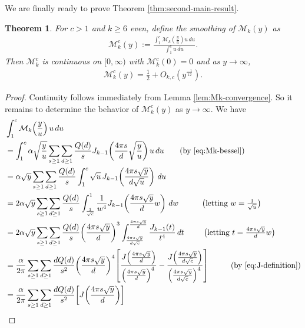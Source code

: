 \documentclass[12pt,letterpaper,reqno]{amsart}
\theoremstyle{plain}
\newtheorem{theorem}{Theorem}[section]
\theoremstyle{definition}
\numberwithin{equation}{section}
\numberwithin{figure}{section}
\numberwithin{table}{section}
\newcommand{\lrp}[1]{\!\left(#1\right)}
\newcommand{\lrb}[1]{\!\left[#1\right]}
\newcommand{\M}{\mathcal{M}}
\begin{document}
We are finally ready to prove Theorem \ref{thm:second-main-result}. 
{
\renewcommand{\thetheorem}{\ref{thm:second-main-result}}
\addtocounter{theorem}{-1}
\begin{theorem} 
    For $c>1$ and $k\ge6$ even, define the smoothing of $\M_k(y)$ as 
    \begin{align}
        \M_k^{c}(y)
        :=
        \frac{\displaystyle\int_1^c \M_k\lrp{\frac{y}{u}}u\, du}
        {\displaystyle\int_1^c u\, d u}.
    \end{align}
    Then $\M_k^{c}$ is continuous on $[0,\infty)$ with $\M_k^{c}(0)=0$ and as $y\to\infty$,
    \begin{align}
        \M_k^{c}(y)=\frac{1}{2}+O_{k,c}\lrp{y^{\frac{-1}{12}}}.
    \end{align}
\end{theorem}
}
\begin{proof}
Continuity follows immediately from Lemma \ref{lem:Mk-convergence}. So it remains to determine the behavior of $\M^{c}_k(y)$ as $y\to\infty$.
We have
\begin{align}
&\int_1^c
\M_k\lrp{\frac{y}{u}}u\,du \\
&=
\int_1^c
\alpha
\sqrt{\frac{y}{u}}
\sum_{s\ge1} \sum_{d\ge1}
\frac{Q(d)}{s}
J_{k-1}\lrp{
\frac{4\pi s}{d}
\sqrt{\frac{y}{u}}
}
u\,du
\qquad \text{(by \eqref{eq:Mk-bessel})}
\\
&=
\alpha \sqrt{y}
\sum_{s\ge1} \sum_{d\ge1}
\frac{Q(d)}{s}
\int_1^c
\sqrt{u}\,
J_{k-1}\lrp{\frac{4\pi s\sqrt{y}}{d\sqrt{u}}}\,du
\\
&=
2\alpha \sqrt y
\sum_{s\ge1} \sum_{d\ge1}
\frac{Q(d)}{s}
\int_{\frac{1}{\sqrt c}}^{1}
\frac{1}{w^4}
J_{k-1}\lrp{\frac{4\pi s \sqrt{y}}{d} w}\,dw
\qquad\quad
\text{\big(letting $w=\tfrac{1}{\sqrt u}$\big)}
\\
&=
2 \alpha \sqrt y
\sum_{s\ge1} \sum_{d\ge1}
\frac{Q(d)}{s} \lrp{\frac{4\pi s \sqrt{y}}{d}}^3
\int_{\frac{4\pi s\sqrt y}{d\sqrt c}}^{\frac{4\pi s\sqrt y}{d}}
\frac{J_{k-1}(t)}{t^4}\,dt
\qquad\ \,
\text{\big(letting $t=\tfrac{4\pi s\sqrt y}{d} w$\big)}
\\
&=
\frac{\alpha}{2\pi}
\sum_{s\ge1} \sum_{d\ge1}
\frac{d Q(d)}{s^2} \lrp{\frac{4\pi s \sqrt{y}}{d}}^4
\lrb{
\frac{
J\lrp{\frac{4\pi s\sqrt y}{d}}
}{
\lrp{\frac{4\pi s\sqrt y}{d}}^4
}
-
\frac{
J\lrp{\frac{4\pi s\sqrt y}{d\sqrt c}}
}{
\lrp{\frac{4\pi s\sqrt y}{d\sqrt c}}^4
}
}
\qquad\quad\!\!
\text{(by \eqref{eq:J-definition})}
\\
&=
\frac{\alpha}{2\pi}
\sum_{s\ge1} \sum_{d\ge1}
\frac{dQ(d)}{s^2}
\lrb{
J\lrp{\frac{4\pi s\sqrt y}{d}}
}
\end{align}
\end{proof}
\end{document}
